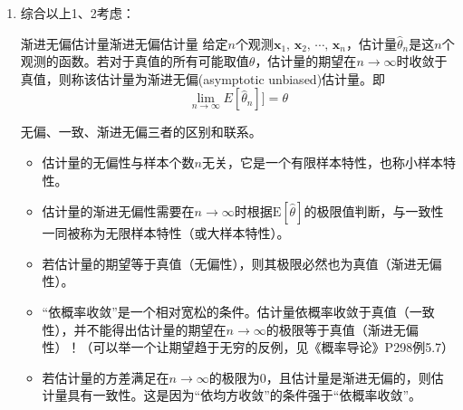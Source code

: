 \begin{enumerate}


            \item 综合以上1、2考虑：
                \begin{definition}{渐进无偏估计量}{渐进无偏估计量}
                    给定$n$个观测$\bm{x}_1,\,\bm{x}_2,\,\cdots,\,\bm{x}_n$，估计量$\hat{\theta}_n$是这$n$个观测的函数。若对于真值的所有可能取值$\theta$，估计量的期望在$n\rightarrow\infty$时收敛于真值，则称该估计量为渐进无偏(asymptotic unbiased)估计量。即
                    \begin{equation}
                        \lim_{n \to \infty}{E\left[\hat{\theta}_n\right]]}=\theta
                    \end{equation}
                \end{definition}
                
                \begin{tcbnote}
                    无偏、一致、渐进无偏三者的区别和联系。
                    \begin{itemize}
                        \item 估计量的无偏性与样本个数$n$无关，它是一个有限样本特性，也称小样本特性。
                        \item 估计量的渐进无偏性需要在$n\rightarrow\infty$时根据$\mathrm{E}\left[\hat{\theta}\right]$的极限值判断，与一致性一同被称为无限样本特性（或大样本特性）。
                        \item 若估计量的期望等于真值（无偏性），则其极限必然也为真值（渐进无偏性）。
                        \item “依概率收敛”是一个相对宽松的条件。估计量依概率收敛于真值（一致性），并不能得出估计量的期望在$n\rightarrow\infty$的极限等于真值（渐进无偏性）！（可以举一个让期望趋于无穷的反例，见《概率导论》P298例5.7）
                        \item 若估计量的方差满足在$n\rightarrow\infty$的极限为0，且估计量是渐进无偏的，则估计量具有一致性。这是因为“依均方收敛”的条件强于“依概率收敛”。
                
                    \end{itemize}



\end{tcbnote}
\end{enumerate}
